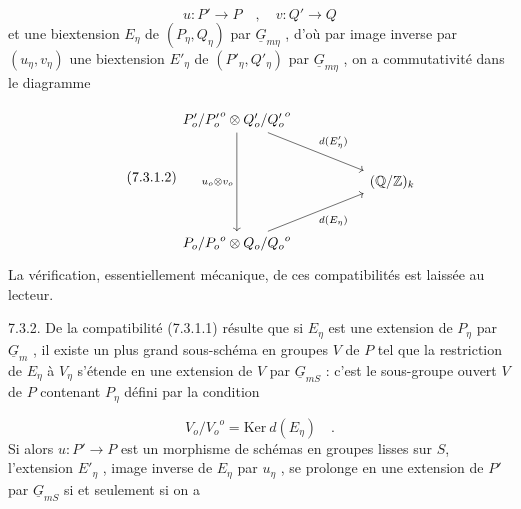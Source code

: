 \begin{equation*}
u : P' \longrightarrow P \quad , \quad v : Q' \longrightarrow Q
\end{equation*}
et une biextension $E_\eta$ de $(P_\eta ,Q_\eta)$ par $\underline{G}_{m\eta}$ , d'où par image inverse par $(u_\eta ,v_\eta)$ une biextension $E'_\eta$ de $(P'_\eta ,Q'_\eta)$ par $\underline{G}_{m\eta}$ , on a commutativité dans le diagramme

\begin{equation}\tag{7.3.1.2}
\begin{tikzcd}[row sep=large, column sep=huge]
{P'_o/{P'_o}^{o} \otimes Q'_o/{Q'_o}^{o}} \arrow[dd, "u_o \otimes v_o"'] \arrow[rd, "d(E'_\eta)"] & \\
 & {(\mathbb{Q}/\mathbb{Z})_k} \\
{P_o/{P_o}^{o} \otimes Q_o/{Q_o}^{o}} \arrow[ru, "d(E_\eta)"'] &
\end{tikzcd}
\end{equation}
La vérification, essentiellement mécanique, de ces compatibilités est laissée au lecteur.

7.3.2. De la compatibilité (7.3.1.1) résulte que si $E_\eta$ est une extension de $P_\eta$ par $\underline{G}_m$ , il existe un plus grand sous-schéma en groupes $V$ de $P$ tel que la restriction de $E_\eta$ à $V_\eta$ s'étende en une extension de $V$ par
$\underline{G}_{mS}$ : c'est le sous-groupe ouvert $V$ de $P$ contenant $P_\eta$ défini par la condition

\begin{equation}\tag{7.3.2.1}
V_o/{V_o}^{o} = \mathrm{Ker}\ d(E_\eta) \quad .
\end{equation}
Si alors $u:P' \longrightarrow P$ est un morphisme de schémas en groupes lisses sur $S$, l'extension $E'_\eta$ , image inverse de $E_\eta$ par $u_\eta$ , se prolonge en une extension de $P'$ par $\underline{G}_{mS}$ si et seulement si on a


